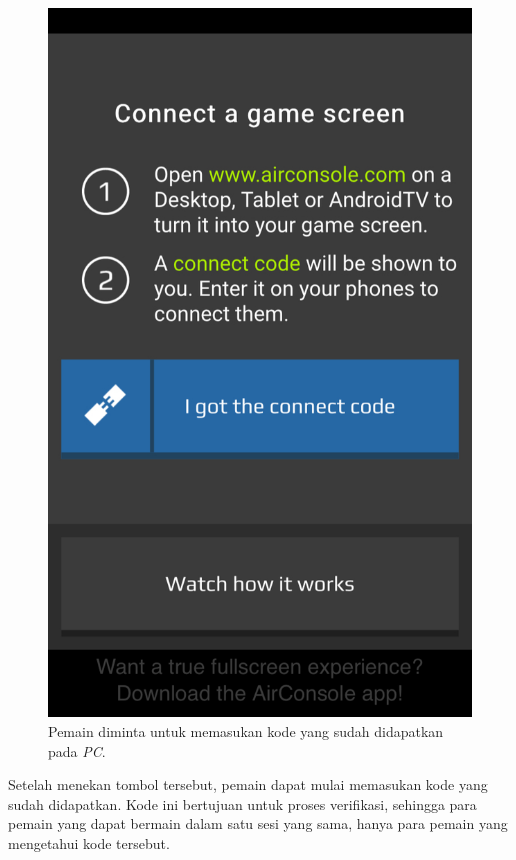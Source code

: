 \begin{figure}[H]
	\centering
	\includegraphics[scale=0.2]{Gambar/air2_code1}
	\caption{Pemain diminta untuk memasukan kode yang sudah didapatkan pada \textit{PC}.}
	\label{fig:19_air2_code1}
\end{figure}


Setelah menekan tombol tersebut, pemain dapat mulai memasukan kode yang sudah didapatkan. Kode ini bertujuan untuk proses verifikasi, sehingga para pemain yang dapat bermain dalam satu sesi yang sama, hanya para pemain yang mengetahui kode tersebut.

